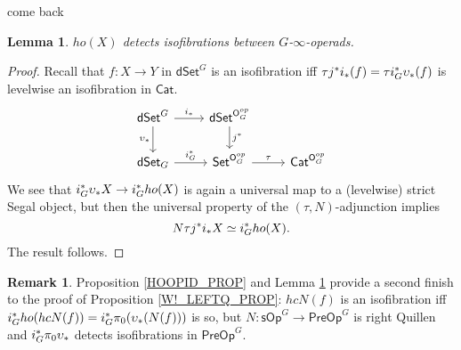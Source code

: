 \documentclass[a4paper,10pt
,draft
]{article}%
\numberwithin{equation}{section}
\numberwithin{figure}{section}
\newtheorem{lemma}[equation]{Lemma}%
\theoremstyle{definition} %
\newtheorem{remark}[equation]{Remark}%
\newcommand{\Set}{\ensuremath{\mathsf{Set}}}
\newcommand{\Cat}{\mathsf{Cat}}
\newcommand{\sOp}{\ensuremath{\mathsf{sOp}}}%
\newcommand{\dSet}{\mathsf{dSet}}
\newcommand{\1}{\ensuremath{\mathbbm 1}}%
\begin{document}
come back

\begin{lemma}
      \label{HOXISOFIB_LEM}
      $ho(X)$ detects isofibrations between $G$-$\infty$-operads.
\end{lemma}
\begin{proof}
      Recall that $f \colon X \to Y$ in $\dSet^G$ is an isofibration iff
      \(
      \tau j^{\**}i_{\**}(f) = \tau i_G^{\**}\upsilon_{\**}(f)
      \)
      is levelwise an isofibration in $\Cat$.
      \[
            \begin{tikzcd}
                  \dSet^G \arrow[r, "i_{\**}"] \arrow[d, "\upsilon_{\**}"']
                  &
                  \dSet^{\mathsf O_G^{op}} \arrow[d, "j^{\**}"]
                  \\
                  \dSet_G \arrow[r, "i_G^{\**}"]
                  &
                  \Set^{\mathsf O_G^{op}} \arrow[r, "\tau"]
                  &
                  \Cat^{\mathsf O_G^{op}}
            \end{tikzcd}
      \]
      We see that $i_G^{\**} \upsilon_{\**} X \to i_G^{\**} ho(X)$ is again a universal map to a (levelwise) strict Segal object,
      but then the universal property of the $(\tau, N)$-adjunction implies
      \[
            N\tau j^{\**}i_{\**}X \simeq i_G^{\**} ho(X).
      \]
      The result follows.
\end{proof}

\begin{remark}
      \label{W!_LEFTQ_REM}
      Proposition \ref{HOOPID_PROP} and Lemma \ref{HOXISOFIB_LEM}
      provide a second finish to the proof of Proposition \ref{W!_LEFTQ_PROP}:
      $hcN(f)$ is an isofibration iff
      $i_G^{\**}ho(hcN(f)) = i_G^{\**} \pi_0(\upsilon_{\**}(N(f)))$ is so,
      but $N \colon \sOp^G \to \mathsf{PreOp}^G$ is right Quillen
      and $i_G^{\**}\pi_0\upsilon_{\**}$ detects isofibrations in $\mathsf{PreOp}^G$.
\end{remark}

      
\end{document}
